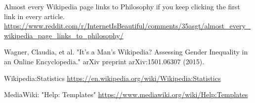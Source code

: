 \documentclass[pre,twocolumn,twoside,superscriptaddress,floatfix, aps, 10pt]{revtex4-1}
\begin{document}
\begin{thebibliography}{1}
     Almost every Wikipedia page links to Philosophy if you keep clicking the first link in every article. 
    \url{https://www.reddit.com/r/InternetIsBeautiful/comments/35asgt/almost_every_wikipedia_page_links_to_philosophy/}

     Wagner, Claudia, et al. "It's a Man's Wikipedia? Assessing Gender Inequality in an Online Encyclopedia." arXiv preprint arXiv:1501.06307 (2015).

     Wikipedia:Statistics 
    \url{https://en.wikipedia.org/wiki/Wikipedia:Statistics}

     MediaWiki: "Help: Templates"
    \url{https://www.mediawiki.org/wiki/Help:Templates}
\end{thebibliography}
\end{document}
